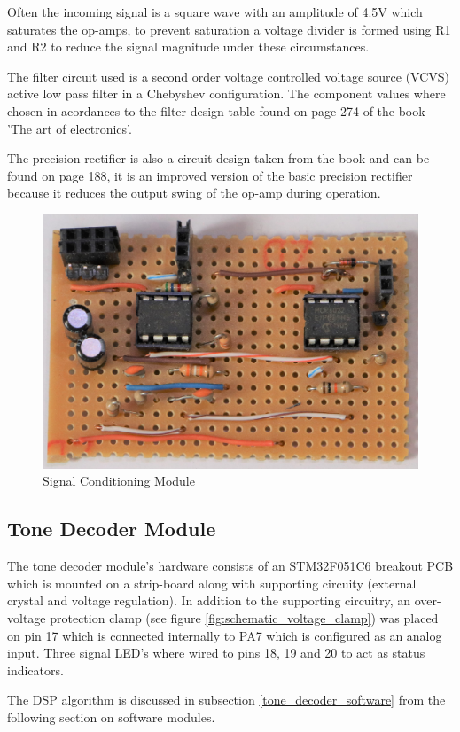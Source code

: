 Often the incoming signal is a square wave with an amplitude of 4.5V which saturates the op-amps, to prevent saturation a voltage divider is formed using R1 and R2 to reduce the signal magnitude under these circumstances.

The filter circuit used is a second order voltage controlled voltage source (VCVS) active low pass filter in a Chebyshev configuration. The component values where chosen in acordances to the filter design table found on page 274 of the book 'The art of electronics'\cite{Horowitz1995}.

The precision rectifier is also a circuit design taken from the book and can be found on page 188, it is an improved version of the basic precision rectifier because it reduces the output swing of the op-amp during operation\cite{Horowitz1995}.

\begin{figure}[H]
	\centering
	\includegraphics[width=.6\textwidth]{figures/modules/filtering_conditioning.jpg}
	\caption{Signal Conditioning Module}
	\label{fig:module_filtering_conditioning}
\end{figure}

\subsection{Tone Decoder Module}

The tone decoder module's hardware consists of an STM32F051C6 breakout PCB which is mounted on a strip-board along with supporting circuity (external crystal and voltage regulation). In addition to the supporting circuitry, an over-voltage protection clamp (see figure \ref{fig:schematic_voltage_clamp}) was placed on pin 17 which is connected internally to PA7 which is configured as an analog input. Three signal LED's where wired to pins 18, 19 and 20 to act as status indicators.

The DSP algorithm is discussed in subsection \ref{tone_decoder_software} from the following section on software modules.


